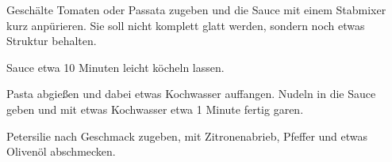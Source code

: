 \begin{recipe}
{    \step%
    Geschälte Tomaten oder Passata zugeben und die Sauce mit einem Stabmixer kurz anpürieren. Sie soll nicht komplett glatt werden, sondern noch etwas Struktur behalten.
    
    \step%
    Sauce etwa 10 Minuten leicht köcheln lassen.
    
    \step%
    Pasta abgießen und dabei etwas Kochwasser auffangen. Nudeln in die Sauce geben und mit etwas Kochwasser etwa 1 Minute fertig garen.
    
    \step%
    Petersilie nach Geschmack zugeben, mit Zitronenabrieb, Pfeffer und etwas Olivenöl abschmecken.
}


\end{recipe}